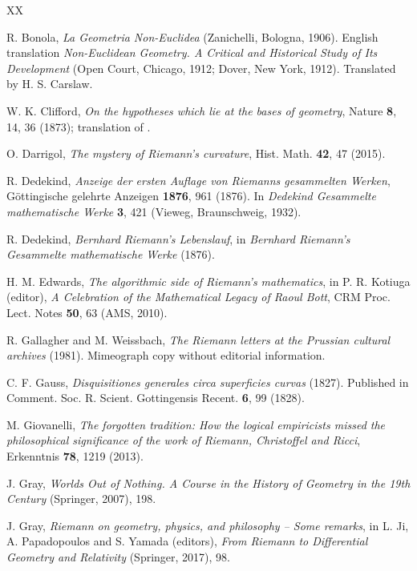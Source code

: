 \documentclass[12pt]{article}
\begin{document}
\begin{thebibliography}{XX}

R. Bonola, {\it La Geometria Non-Euclidea} (Zanichelli, Bologna, 1906). English translation {\it Non-Euclidean Geometry. A Critical and Historical Study of Its Development} (Open Court, Chicago, 1912; Dover, New York, 1912). Translated by H. S. Carslaw.

W. K. Clifford, {\it On the hypotheses which lie at the bases of geometry}, Nature {\bf 8}, 14, 36 (1873); translation of \cite{Riemann1868b}.

O. Darrigol, {\it The mystery of Riemann's curvature}, Hist. Math. {\bf 42}, 47 (2015). %

R. Dedekind, {\it Anzeige der ersten Auflage von Riemanns gesammelten Werken}, G\"ottingische gelehrte Anzeigen {\bf 1876}, 961 (1876). In {\it Dedekind Gesammelte mathematische Werke} {\bf 3}, 421 (Vieweg, Braunschweig, 1932). %

R. Dedekind, {\it Bernhard Riemann's Lebenslauf}, in {\it Bernhard Riemann's Gesammelte mathematische Werke} (1876).

H. M. Edwards, {\it The algorithmic side of Riemann's mathematics}, in P. R. Kotiuga (editor), {\it A Celebration of the Mathematical Legacy of Raoul Bott}, CRM Proc. Lect. Notes {\bf 50}, 63 (AMS, 2010).

R. Gallagher and M. Weissbach, {\it The Riemann letters at the Prussian cultural archives} (1981). Mimeograph copy without editorial information.

C. F. Gauss, {\it Disquisitiones generales circa superficies curvas} (1827). Published in Comment. Soc. R. Scient. Gottingensis Recent. {\bf 6}, 99 (1828).

M. Giovanelli, {\it The forgotten tradition: How the logical empiricists missed the philosophical significance of the work of Riemann, Christoffel and Ricci}, Erkenntnis {\bf 78}, 1219 (2013). %

J. Gray, {\it Worlds Out of Nothing. A Course in the History of Geometry in the 19th Century} (Springer, 2007), 198.

J. Gray, {\it Riemann on geometry, physics, and philosophy -- Some remarks}, in L. Ji, A. Papadopoulos and S. Yamada (editors), {\it From Riemann to Differential Geometry and Relativity} (Springer, 2017), 98.


\end{thebibliography}
\end{document}
